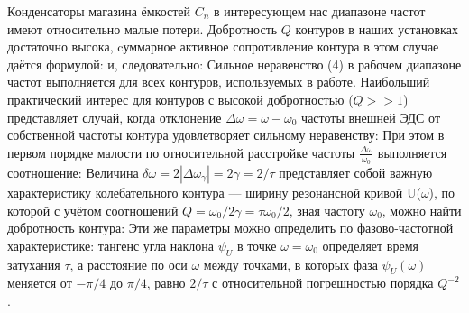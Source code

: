 	Конденсаторы магазина ёмкостей $C_n$ в интересующем нас диапазоне частот имеют относительно
малые потери.\n\n
Добротность $Q$ контуров в наших установках достаточно высока, cуммарное активное сопротивление контура в этом случае даётся формулой:
	и, следовательно:
	\n
	Сильное неравенство (4) в рабочем диапазоне частот выполняется для всех контуров, используемых в работе.\n\n
	Наибольший практический интерес для контуров с высокой добротностью ($Q >> 1$) представляет случай, когда отклонение $\Delta \omega = \omega - \omega_0$ частоты внешней ЭДС от собственной частоты контура удовлетворяет сильному неравенству:
	\eb{|\Delta \omega| << \omega_0}
	\n
	При этом в первом порядке малости по относительной расстройке частоты $\frac{\Delta \omega}{\omega_0}$ выполняется соотношение:
	\n
	Величина $\delta \omega = 2 |\Delta \omega_{\gamma}| = 2\gamma = 2 / \tau$ представляет собой важную характеристику колебательного контура — ширину резонансной кривой U($\omega$), по которой с учётом соотношений $Q = \omega_0 / 2 \gamma = \tau \omega_0 / 2$, зная частоту $\omega_0$, можно найти добротность контура:
	\n
	Эти же параметры можно определить по фазово-частотной характеристике: тангенс угла наклона $\psi_U$ в точке $\omega = \omega_0$ определяет время затухания $\tau$, а расстояние по оси $\omega$ между точками, в которых фаза $\psi_U (\omega)$ меняется от $- \pi / 4$ до $\pi / 4$, равно $2 / \tau$ с относительной
погрешностью порядка $Q^{-2}$.
